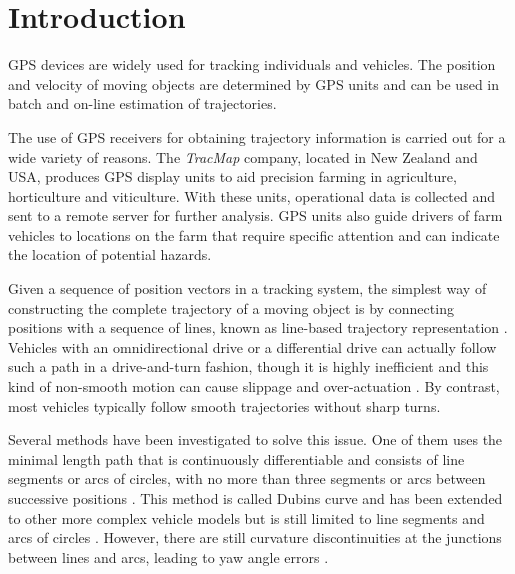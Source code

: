 

\section{Introduction}

GPS devices are widely used for tracking individuals and vehicles. The position and velocity of moving objects are determined by GPS units and can be used in batch and on-line estimation of trajectories. 

The use of GPS receivers for obtaining trajectory information is carried out for a wide variety of reasons. The \textit{TracMap} company, located in New Zealand and USA, produces GPS display units to aid precision farming in agriculture, horticulture and viticulture. With these units, operational data is collected and sent to a remote server for further analysis. GPS units also guide drivers of farm vehicles to locations on the farm that require specific attention and can indicate the location of potential hazards. 

Given a sequence of position vectors in a tracking system, the simplest way of constructing the complete trajectory of a moving object is by connecting positions with a sequence of lines, known as line-based trajectory representation \citep{agarwal2003indexing}. Vehicles with an omnidirectional drive or a differential drive can actually follow such a path in a drive-and-turn fashion, though it is highly inefficient \citep{gloderer2010spline} and this kind of non-smooth motion can cause slippage and over-actuation \citep{magid2006spline}. By contrast, most vehicles typically follow smooth trajectories without sharp turns. 

Several methods have been investigated to solve this issue. One of them uses the minimal length path that is continuously differentiable and consists of line segments or arcs of circles, with no more than three segments or arcs between successive positions \citep{dubins1957curves}. This method is called Dubins curve and has been extended to other more complex vehicle models but is still limited to line segments and arcs of circles \citep{yang2010analytical}. However, there are still curvature discontinuities at the junctions between lines and arcs, leading to yaw angle errors \citep{wang2017curvature}. 

